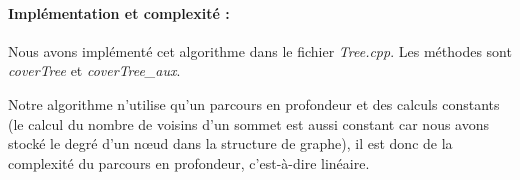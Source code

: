     \paragraph{Implémentation et complexité :\\}

    \indent Nous avons implémenté cet algorithme dans le fichier
    \emph{Tree.cpp}. Les méthodes sont \emph{coverTree} et
    \emph{coverTree\_aux}.

    Notre algorithme n'utilise qu'un parcours en profondeur et des
    calculs constants (le calcul du nombre de voisins d'un sommet est
    aussi constant car nous avons stocké le degré d'un n\oe{}ud dans la
    structure de graphe), il est donc de la complexité du parcours en
    profondeur, c'est-à-dire linéaire.